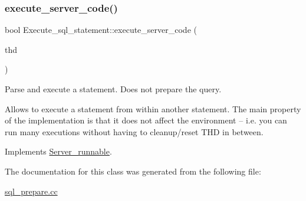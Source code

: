 \subsubsection{\texorpdfstring{execute\+\_\+server\+\_\+code()}{execute\_server\_code()}}
{\footnotesize\ttfamily bool Execute\+\_\+sql\+\_\+statement\+::execute\+\_\+server\+\_\+code (\begin{DoxyParamCaption}\item[{T\+HD $\ast$}]{thd }\end{DoxyParamCaption})\hspace{0.3cm}{\ttfamily [virtual]}}

Parse and execute a statement. Does not prepare the query.

Allows to execute a statement from within another statement. The main property of the implementation is that it does not affect the environment -- i.\+e. you can run many executions without having to cleanup/reset T\+HD in between. 

Implements \mbox{\hyperlink{classServer__runnable}{Server\+\_\+runnable}}.



The documentation for this class was generated from the following file\+:\begin{DoxyCompactItemize}
\item 
\mbox{\hyperlink{sql__prepare_8cc}{sql\+\_\+prepare.\+cc}}\end{DoxyCompactItemize}
